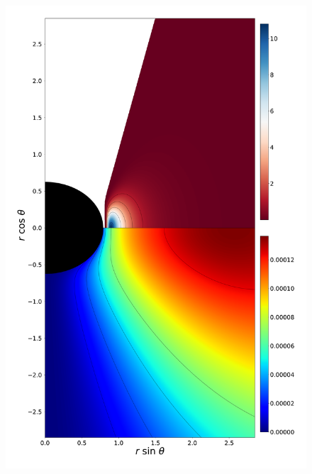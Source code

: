 \documentclass[twocolumn,aps,showpacs,showkeys,prd,superscriptaddress,byrevtex, amsmath]{revtex4-1}
\begin{document}
\begin{figure}
\includegraphics[scale=0.12]{figures/fig6_I__10.pdf}
\hspace{-0.4cm}

\end{figure}
\end{document}

